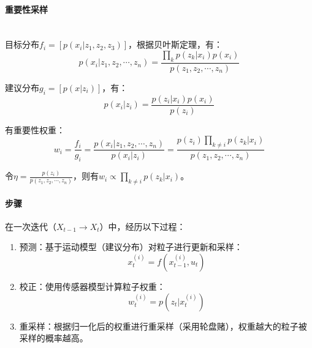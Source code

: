 \documentclass[
12pt, %
a4paper, 
oneside, %
headinclude,footinclude, %
]{scrartcl}
\begin{document}
\paragraph{重要性采样}~\\

目标分布$ f_i = [p(x_i|z_1, z_2, z_3)] $，根据贝叶斯定理，有：
$$ p(x_i|z_1, z_2, \cdots, z_n) = \frac{\prod_k p(z_k|x_i)p(x_i)}{p(z_1, z_2, \cdots, z_n)} $$

建议分布$ g_i = [p(x|z_i)] $，有：
$$ p(x_i|z_i) = \frac{p(z_i|x_i)p(x_i)}{p(z_i)} $$

有重要性权重：
$$ w_i = \frac{f_i}{g_i} = \frac{p(x_i|z_1, z_2, \cdots, z_n)}{p(x_i|z_i)} = \frac{p(z_i)\prod_{k\neq i}p(z_k|x_i)}{p(z_1, z_2, \cdots, z_n)} $$

令$ \eta = \frac{p(z_i)}{p(z_1, z_2, \cdots, z_n)} $，则有$ w_i \propto \prod_{k\neq i}p(z_k|x_i) $。
\paragraph{步骤}
在一次迭代（$ X_{t - 1} \rightarrow X_t $）中，经历以下过程：
\begin{enumerate}
\item 预测：基于运动模型（建议分布）对粒子进行更新和采样：
$$ x_t^{(i)} = f(x_{t - 1}^{(i)}, u_t) $$
\item 校正：使用传感器模型计算粒子权重：
$$ w_t^{(i)} = p(z_t | x_t^{(i)}) $$
\item 重采样：根据归一化后的权重进行重采样（采用轮盘赌），权重越大的粒子被采样的概率越高。
\end{enumerate}
\end{document}
